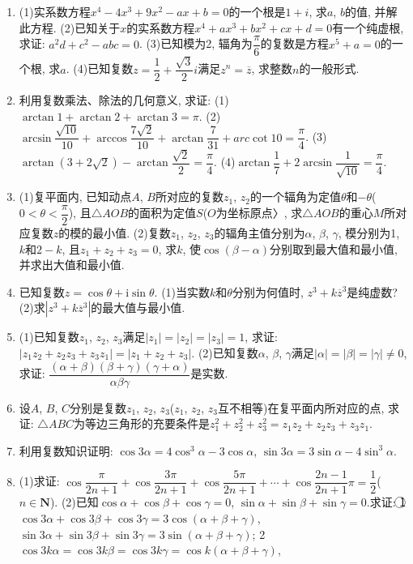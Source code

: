 \documentclass[10pt,a4paper]{article}
\begin{document}
\begin{enumerate}[1.]
\item (1)实系数方程$x^4-4x^3+9x^2-ax+b=0$的一个根是$1+i$, 求$a$, $b$的值, 并解此方程.
(2)已知关于$x$的实系数方程$x^4+ax^3+bx^2+cx+d=0$有一个纯虚根, 求证: $a^2d+c^2-abc=0$.
(3)已知模为2, 辐角为$\dfrac{\pi }6$的复数是方程$x^5+a=0$的一个根, 求$a$.
(4)已知复数$z=\dfrac 12+\dfrac{\sqrt 3}2i$满足$z^n=\overline z$, 求整数$n$的一般形式.
\item 利用复数乘法、除法的几何意义, 求证:
(1)$\arctan 1+\arctan 2+\arctan 3=\pi$.
(2)$\arcsin \dfrac{\sqrt {10}}{10}+\arccos \dfrac{7\sqrt 2}{10}+\arctan \dfrac 7{31}+arc\cot 10=\dfrac{\pi }4$.
(3)$\arctan (3+2\sqrt 2)-\arctan \dfrac{\sqrt 2}2=\dfrac{\pi }4$.
(4)$\arctan \dfrac 17+2\arcsin \dfrac 1{\sqrt {10}}=\dfrac{\pi }4$.
\item (1)复平面内, 已知动点$A$, $B$所对应的复数$z_1$, $z_2$的一个辐角为定值$\theta$和$-\theta$($0<\theta <\dfrac{\pi }2$), 且$\triangle AOB$的面积为定值$S$($O$为坐标原点〉, 求$\triangle AOB$的重心$M$所对应复数$z$的模的最小值.
(2)复数$z_1$, $z_2$, $z_3$的辐角主值分别为$\alpha$, $\beta$, $\gamma$, 模分别为1, $k$和$2-k$, 且$z_1+z_2+z_3=0$, 求$k$, 使$\cos (\beta -\alpha)$分别取到最大值和最小值, 并求出大值和最小值.
\item 已知复数$z=\cos \theta +\mathrm{i}\sin \theta$.
(1)当实数$k$和$\theta$分别为何值时, $z^3+k\overline z^3$是纯虚数?
(2)求$|z^3+k\overline z^3|$的最大值与最小值.
\item (1)已知复数$z_1$, $z_2$, $z_3$满足$|z_1|=|z_2|=|z_3|=1$, 求证: $|z_1z_2+z_2z_3+z_3z_1|=|z_1+z_2+z_3|$.
(2)已知复数$\alpha$, $\beta$, $\gamma$满足$|\alpha|=|\beta|=|\gamma|\ne 0$, 求证: $\dfrac{(\alpha +\beta)(\beta +\gamma)(\gamma +\alpha)}{\alpha \beta \gamma }$是实数.
\item 设$A$, $B$, $C$分别是复数$z_1$, $z_2$, $z_3$($z_1$, $z_2$, $z_3$互不相等)在复平面内所对应的点, 求证: $\triangle ABC$为等边三角形的充要条件是$z_1^2+z_2^2+z_3^2=z_1z_2+z_2z_3+z_3z_1$.
\item 利用复数知识证明: $\cos 3\alpha =4\cos ^3\alpha -3\cos \alpha$, $\sin 3\alpha =3\sin \alpha -4\sin ^3\alpha$.
\item (1)求证: $\cos \dfrac{\pi }{2n+1}+\cos \dfrac{3\pi }{2n+1}+\cos \dfrac{5\pi }{2n+1}+\cdots +\cos \dfrac{2n-1}{2n+1}\pi =\dfrac 12$($n\in \mathbf{N}$).
(2)已知$\cos \alpha +\cos \beta +\cos \gamma =0$, $\sin \alpha +\sin \beta +\sin \gamma =0$.求证:
\textcircled{1} $\cos 3\alpha +\cos 3\beta +\cos 3\gamma =3\cos (\alpha +\beta +\gamma)$, $\sin 3\alpha +\sin 3\beta +\sin 3\gamma =3\sin (\alpha +\beta +\gamma)$;
\textcircled{2} $\cos 3k\alpha =\cos 3k\beta =\cos 3k\gamma =\cos k(\alpha +\beta +\gamma)$,

\end{enumerate}
\end{document}
